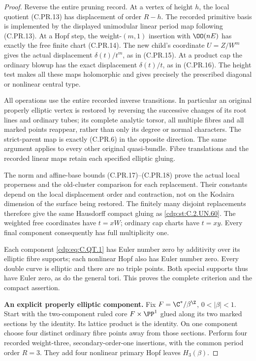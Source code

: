 \begin{proof}
Reverse the entire pruning record.
At a vertex of height $h$, the
local quotient (C.PR.13) has
displacement of order $R-h$.
The recorded primitive basis is
implemented by the displayed
unimodular linear period map
following (C.PR.13). At a Hopf
step, the weight-$(m,1)$ insertion
with $\OO(nE)$ has exactly the
free finite chart (C.PR.14).
The new child's coordinate
$U=Z/W^m$ gives the actual
displacement $\delta(t)/t^m$,
as in (C.PR.15). At a product
cap the ordinary blowup has
the exact displacement
$\delta(t)/t$, as in (C.PR.16).
The height test makes all these
maps holomorphic and gives
precisely the prescribed diagonal
or nonlinear central type.

All operations use the entire
recorded inverse transitions.
In particular an original
properly elliptic vertex is
restored by reversing the
successive changes of its
root lines and ordinary tubes;
its complete analytic torsor,
all multiple fibres and all
marked points reappear, rather
than only its degree or normal
characters. The strict-parent
map is exactly (C.PR.6) in the
opposite direction. The same
argument applies to every
other original quasi-bundle.
Fibre translations and the
recorded linear maps retain
each specified elliptic gluing.

The norm and affine-base bounds
(C.PR.17)--(C.PR.18) prove the
actual local properness and
the old-cluster comparison for
each replacement. Their constants
depend on the local displacement
order and contraction, not on the
Kodaira dimension of the surface
being restored. The finitely many
disjoint replacements therefore
give the same Hausdorff compact
gluing as \ref{cdp:st:C.2.UN.60}. The weighted
free coordinates have $t=xW$;
ordinary cap charts have $t=xy$.
Every final component consequently
has full multiplicity one.

Each component \eqref{cdp:eq:C.QT.1} has Euler
number zero by additivity over
its elliptic fibre supports;
each nonlinear Hopf also has
Euler number zero. Every double
curve is elliptic and there are
no triple points. Both special
supports thus have Euler zero,
as do the general tori. This
proves the complete criterion
and the compact assertion.

\par\medskip\noindent\textbf{An explicit properly elliptic component.}
Fix $F=\C^*/\beta^{\Z}$, $0<|\beta|<1$.
Start with the two-component
ruled core $F\times\PP^1$
glued along its two marked
sections by the identity.
Its lattice product is the
identity. On one component
choose four distinct ordinary
fibre points away from those
sections. Perform four recorded
weight-three, secondary-order-one
insertions, with the common
period order $R=3$.
They add four nonlinear primary
Hopf leaves $H_3(\beta)$.


\end{proof}
